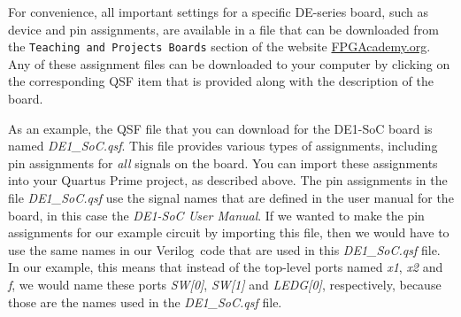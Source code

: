 \documentclass[11pt, twoside, pdftex]{article}
\newcommand{\typeName}{Verilog}
\begin{document}


















For convenience, all important settings for a specific DE-series board, such as device and
pin assignments, are available in a file that can be downloaded from the 
\texttt{Teaching and Projects Boards} section of the website
{\small \href{https://www.fpgacademy.org/boards.html} {FPGAcademy.org}}. 
Any of these assignment files can be downloaded to your computer by clicking on the 
corresponding {\sf QSF} item that is provided along with the description of the board. 

As an example, the {\sf QSF} file that you can download for the DE1-SoC board is 
named {\it DE1\_SoC.qsf}. This file provides various types of assignments, including
pin assignments for {\it all} signals on the board. You can import these assignments into
your Quartus Prime project, as described above. The pin assignments in the file 
{\it DE1\_SoC.qsf} use the signal names that are defined in the user manual for the board,
in this case the {\it DE1-SoC User Manual}.  
If we wanted to make the pin assignments for our example circuit 
by importing this file, then we would have to use the same names in our \typeName~code that
are used in this {\it DE1\_SoC.qsf} file. In our example, this means that instead of the
top-level ports named {\it x1}, {\it x2} and {\it f}, we would name these ports 
{\it SW[0]}, {\it SW[1]} and {\it LEDG[0]}, respectively, because those are the names
used in the {\it DE1\_SoC.qsf} file. 
\end{document}

